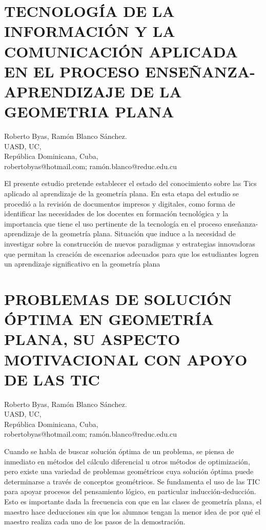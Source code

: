 \section{TECNOLOGÍA DE LA INFORMACIÓN Y LA COMUNICACIÓN APLICADA EN EL PROCESO
ENSEÑANZA-APRENDIZAJE DE LA GEOMETRIA PLANA}

\begin{datos}
Roberto Byas, Ramón Blanco Sánchez. \\
UASD,  UC, \\
\hfill República Dominicana, Cuba, \\
 \hfill robertobyas@hotmail.com; ramón.blanco@reduc.edu.cu  
\end{datos}

El presente estudio pretende establecer el estado del conocimiento
sobre las Tics aplicado al aprendizaje de la geometría plana. En esta
etapa del estudio se procedió a la revisión de documentos impresos
y digitales, como forma de identificar las necesidades de los docentes
en formación tecnológica y la importancia que tiene el uso pertinente
de la tecnología en el proceso enseñanza-aprendizaje de la geometría
plana. Situación que induce a la necesidad de investigar sobre la
construcción de nuevos paradigmas y estrategias innovadoras que permitan
la creación de escenarios adecuados para que los estudiantes logren
un aprendizaje significativo en la geometría plana


\section{PROBLEMAS DE SOLUCIÓN ÓPTIMA EN GEOMETRÍA PLANA, SU ASPECTO MOTIVACIONAL
CON APOYO DE LAS TIC }

\begin{datos}
Roberto Byas, Ramón Blanco Sánchez. \\
UASD,  UC, \\
\hfill República Dominicana, Cuba, \\
 \hfill robertobyas@hotmail.com; ramón.blanco@reduc.edu.cu  
\end{datos}

Cuando se habla de buscar solución óptima de un problema, se piensa
de inmediato en métodos del cálculo diferencial u otros métodos de
optimización, pero existe una variedad de problemas geométricos cuya
solución óptima puede determinarse a través de conceptos geométricos.
Se fundamenta el uso de las TIC para apoyar procesos del pensamiento
lógico, en particular inducción-deducción. Esto es importante dada
la frecuencia con que en las clases de geometría plana, el maestro
hace deducciones sin que los alumnos tengan la menor idea de por qué
el maestro realiza cada uno de los pasos de la demostración.



